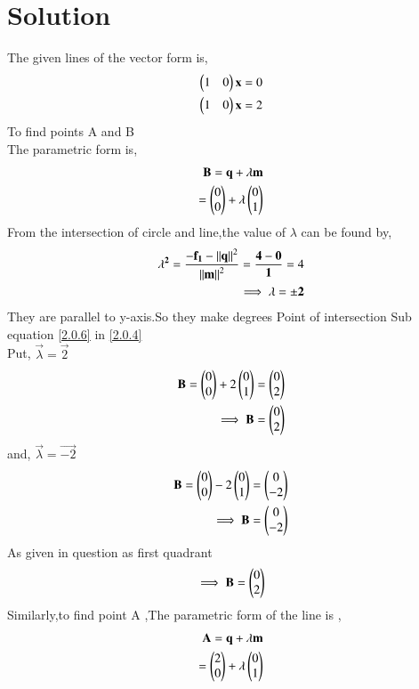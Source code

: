 \documentclass[journal,12pt,twocolumn]{IEEEtran}
\begin{document}
\section{Solution}
The given lines of the vector form is,
\begin{align}
\begin{pmatrix}1 & 0\end{pmatrix}\mathbf{x}=0
\\
\begin{pmatrix}1 & 0\end{pmatrix}\mathbf{x}=2
\end{align}
To find points A and B
\\
The parametric form is,
\begin{align}
\mathbf{B}=\mathbf{q}+\lambda \mathbf{m}\\
=\begin{pmatrix}0\\0\end{pmatrix}+\lambda \begin{pmatrix}0\\1\end{pmatrix} \label{2.0.4}
\end{align}
From the intersection of circle and line,the value of $\lambda$ can be found by,
\begin{align}
\mathbf{\lambda^2}=\frac{{\mathbf{-f_1}-\left\lVert\mathbf{q}\right\rVert^2 }}{{\left\lVert\mathbf{m}\right\rVert^2}}=\frac{{\mathbf{4}-\mathbf{0} }}{{ \mathbf{1 }}}=4
\\
\implies \mathbf{\lambda}=\pm\mathbf{2} \label{2.0.6}
\end{align}
They are parallel to y-axis.So they make  degrees
 Point of intersection
Sub equation \eqref{2.0.6} in \eqref{2.0.4}
\\
Put, $\vec{\lambda}=\vec{2}$
\begin{align}
\mathbf{B}=\begin{pmatrix}0\\0\end{pmatrix}+2\begin{pmatrix}0\\ 1\end{pmatrix}=\begin{pmatrix}0 \\ 2\end{pmatrix}
\\ 
\implies\mathbf{B}=\begin{pmatrix}0\\2\end{pmatrix}
\end{align}
and, $\vec{\lambda}=\vec{-2}$
\begin{align}
\mathbf{B}=\begin{pmatrix}0 \\0\end{pmatrix}-2\begin{pmatrix}0\\1\end{pmatrix}=\begin{pmatrix}0 \\ -2\end{pmatrix}
\\ 
\implies\mathbf{B}=\begin{pmatrix}0\\ -2\end{pmatrix}
\end{align}
As given in question as first quadrant
\begin{align}
\implies \mathbf{B}=\begin{pmatrix}0\\2\end{pmatrix}   
\end{align}
Similarly,to find point A ,The parametric form of the line is ,
\begin{align}
 \mathbf{A}=\mathbf{q}+\lambda \mathbf{m}\\ =\begin{pmatrix}2\\0\end{pmatrix}+\lambda \begin{pmatrix}0\\1\end{pmatrix} \label{2.0.10}
\end{align}
\end{document}
